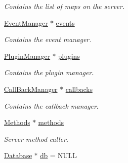 \begin{DoxyCompactItemize}
\begin{DoxyCompactList}\small\item\em Contains the list of maps on the server. \end{DoxyCompactList}\item 
\hypertarget{classManiaPP_a326ab543ab98eefcba8a4b616e794b96}{\hyperlink{classEventManager}{Event\-Manager} $\ast$ \hyperlink{classManiaPP_a326ab543ab98eefcba8a4b616e794b96}{events}}\label{classManiaPP_a326ab543ab98eefcba8a4b616e794b96}

\begin{DoxyCompactList}\small\item\em Contains the event manager. \end{DoxyCompactList}\item 
\hypertarget{classManiaPP_a199f7d80431e7f13e52e6010347f644a}{\hyperlink{classPluginManager}{Plugin\-Manager} $\ast$ \hyperlink{classManiaPP_a199f7d80431e7f13e52e6010347f644a}{plugins}}\label{classManiaPP_a199f7d80431e7f13e52e6010347f644a}

\begin{DoxyCompactList}\small\item\em Contains the plugin manager. \end{DoxyCompactList}\item 
\hypertarget{classManiaPP_af468d4b6eea93fd836950551eb7d3a01}{\hyperlink{classCallBackManager}{Call\-Back\-Manager} $\ast$ \hyperlink{classManiaPP_af468d4b6eea93fd836950551eb7d3a01}{callbacks}}\label{classManiaPP_af468d4b6eea93fd836950551eb7d3a01}

\begin{DoxyCompactList}\small\item\em Contains the callback manager. \end{DoxyCompactList}\item 
\hypertarget{classManiaPP_a48cb1ddf328d18361417986fe8ab069c}{\hyperlink{classMethods}{Methods} $\ast$ \hyperlink{classManiaPP_a48cb1ddf328d18361417986fe8ab069c}{methods}}\label{classManiaPP_a48cb1ddf328d18361417986fe8ab069c}

\begin{DoxyCompactList}\small\item\em Server method caller. \end{DoxyCompactList}\item 
\hypertarget{classManiaPP_a4239002fe32663b70f0f875f41b57cbc}{\hyperlink{classDatabase}{Database} $\ast$ \hyperlink{classManiaPP_a4239002fe32663b70f0f875f41b57cbc}{db} = N\-U\-L\-L}\label{classManiaPP_a4239002fe32663b70f0f875f41b57cbc}


\end{DoxyCompactItemize}
